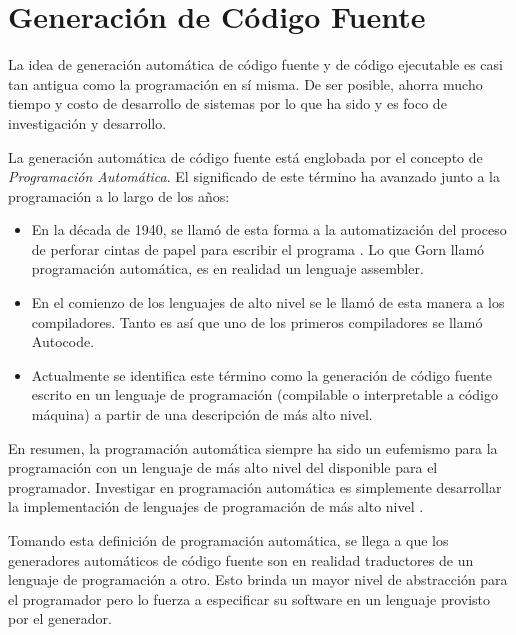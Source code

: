 \section{Generación de Código Fuente}

La idea de generación automática de código fuente y de código ejecutable es casi
tan antigua como la programación en sí misma. De ser posible, ahorra mucho
tiempo y costo de desarrollo de sistemas por lo que ha sido y es foco de
investigación y desarrollo.

La generación automática de código fuente está englobada por el concepto de
\textit{Programación Automática}. El significado de este término ha avanzado
junto a la programación a lo largo de los años:
\begin{itemize}
  \item En la década de 1940, se llamó de esta forma a la automatización del
  proceso de perforar cintas de papel para escribir el programa
  \cite{AutomaticProgrammingGorn}. Lo que Gorn llamó programación automática, es
  en realidad un lenguaje assembler.
  \item En el comienzo de los lenguajes de alto nivel se le llamó de esta manera
  a los compiladores. Tanto es así que uno de los primeros compiladores se llamó
  Autocode.
  \item Actualmente se identifica este término como la generación de código
  fuente escrito en un lenguaje de programación (compilable o interpretable a
  código máquina) a partir de una descripción de más alto nivel.
\end{itemize}

En resumen, la programación automática siempre ha sido un eufemismo para la
programación con un lenguaje de más alto nivel del disponible para el
programador. Investigar en programación automática es simplemente desarrollar
la implementación de lenguajes de programación de más alto nivel
\cite{Parnas:1985:SAS:214956.214961}.

Tomando esta definición de programación automática, se llega a que los 
generadores automáticos de código fuente son en realidad traductores de un
lenguaje de programación a otro. Esto brinda un mayor nivel de abstracción para
el programador pero lo fuerza a especificar su software en un lenguaje
provisto por el generador.

